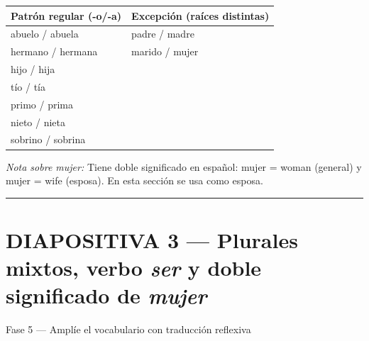 \documentclass[a4paper,11pt]{article}
\begin{document}
\vspace{0.8cm}

\begin{center}
\end{center}

\vspace{0.8cm}

\begin{center}
\renewcommand{\arraystretch}{1.4}
\begin{tabular}{|l|l|}
\hline
\rowcolor{gris}
\textbf{Patrón regular (-o/-a)} & \textbf{Excepción (raíces distintas)} \\
\hline
abuelo / abuela & padre / madre \\
hermano / hermana & marido / mujer \\
hijo / hija & \\
tío / tía & \\
primo / prima & \\
nieto / nieta & \\
sobrino / sobrina & \\
\hline
\end{tabular}
\end{center}

\vspace{0.5cm}

{\small\textit{Nota sobre mujer:} Tiene doble significado en español: mujer = woman (general) y mujer = wife (esposa). En esta sección se usa como esposa.}

\newpage


\noindent\textcolor{violeta}{\rule{\linewidth}{2.5pt}}

\section*{DIAPOSITIVA 3 — Plurales mixtos, verbo \textit{ser} y doble significado de \textit{mujer}}

{\small Fase 5 — Amplíe el vocabulario con traducción reflexiva}

\vspace{0.5cm}

\end{document}
